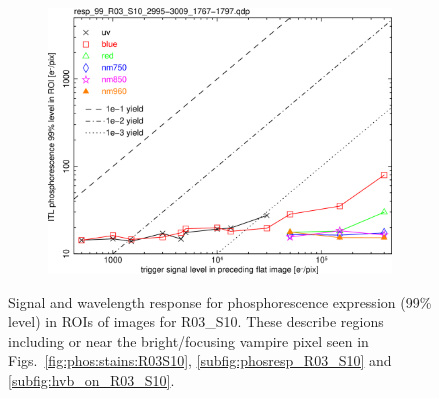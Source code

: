 \begin{figure}[!htbp]
\centering
\begin{subfigure}{0.45\textwidth}    
  \centering
  \includegraphics[width=\textwidth]{figures/phosphorescence-survey/phos_resp/resp_99_R03_S10_2995-3009_1767-1797.png}    
\end{subfigure}
\newline
\caption{Signal and wavelength response for phosphorescence expression (99\% level) in ROIs of images for R03\_S10. These describe regions including or near the bright/focusing  vampire pixel seen in Figs.~\ref{fig:phos:stains:R03S10}, \ref{subfig:phosresp_R03_S10} and \ref{subfig:hvb_on_R03_S10}.}
\label{fig:phos:resp:R03S10}
\end{figure}

